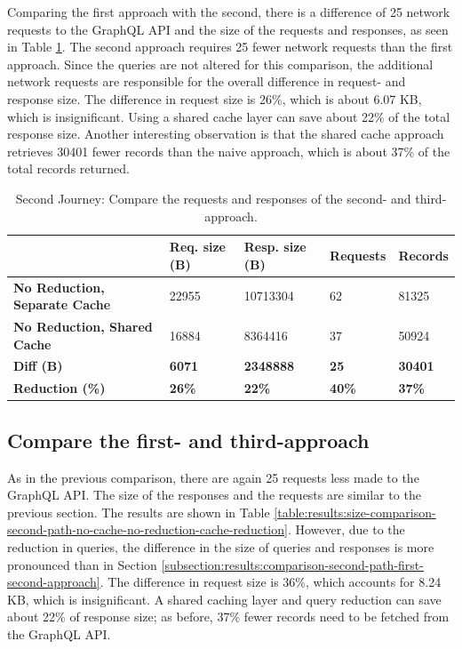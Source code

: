 Comparing the first approach with the second, there is a difference of 25 network requests to the GraphQL \ac{API} and the size of the requests and responses, as seen in Table \ref{table:results:size-comparison-second-path-cache-no-reduction-cache-reduction}. The second approach requires 25 fewer network requests than the first approach. Since the queries are not altered for this comparison, the additional network requests are responsible for the overall difference in request- and response size. The difference in request size is 26\%, which is about 6.07 KB, which is insignificant. Using a shared cache layer can save about 22\% of the total response size. Another interesting observation is that the shared cache approach retrieves 30401 fewer records than the naive approach, which is about 37\% of the total records returned.

\ifshowTables
\begin{table}[H]
  \begin{tabular}{|l|l|l|l|l|}
  \hline
  & \textbf{Req. size (B)} & \textbf{Resp. size (B)} & \textbf{Requests} & \textbf{Records} \\
  \hline
  \textbf{No Reduction, Separate Cache} & 22955 & 10713304 & 62 & 81325 \\
  \hline
  \textbf{No Reduction, Shared Cache} & 16884 & 8364416 & 37 & 50924 \\
  \hline
  \hline
  \textbf{Diff (B)} & \textbf{6071} & \textbf{2348888} & \textbf{25} & \textbf{30401} \\
  \hline
  \textbf{Reduction (\%)} & \textbf{26\%} & \textbf{22\%} & \textbf{40\%} & \textbf{37\%} \\
  \hline
  \end{tabular}
  \caption{Second Journey: Compare the requests and responses of the second- and third-approach.}\label{table:results:size-comparison-second-path-cache-no-reduction-cache-reduction}
\end{table}
\fi

\subsection{Compare the first- and third-approach}\label{subsection:results:comparison-second-path-second-third-approach}

As in the previous comparison, there are again 25 requests less made to the GraphQL \ac{API}. The size of the responses and the requests are similar to the previous section. The results are shown in Table \ref{table:results:size-comparison-second-path-no-cache-no-reduction-cache-reduction}. However, due to the reduction in queries, the difference in the size of queries and responses is more pronounced than in Section \ref{subsection:results:comparison-second-path-first-second-approach}. The difference in request size is 36\%, which accounts for 8.24 KB, which is insignificant. A shared caching layer and query reduction can save about 22\% of response size; as before, 37\% fewer records need to be fetched from the GraphQL \ac{API}.

